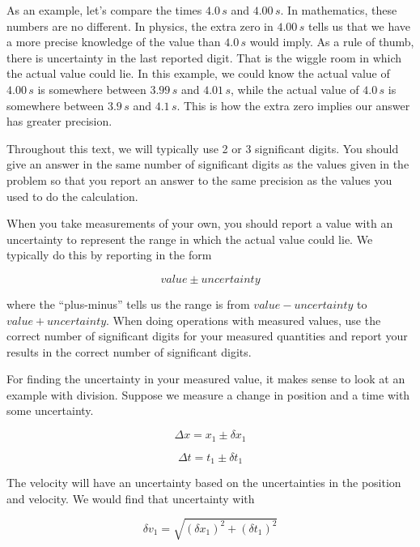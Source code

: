 \documentclass[12pt]{book}
\begin{document}
As an example, let's compare the times $4.0 \, s$ and $4.00 \, s$. In mathematics, these numbers are no different. In physics, the extra zero in $4.00 \, s$ tells us that we have a more precise knowledge of the value than $4.0 \, s$ would imply. As a rule of thumb, there is uncertainty in the last reported digit. That is the wiggle room in which the actual value could lie. In this example, we could know the actual value of $4.00 \, s$ is somewhere between $3.99 \, s$ and $4.01 \, s$, while the actual value of $4.0 \, s$ is somewhere between $3.9 \, s$ and $4.1 \, s$. This is how the extra zero implies our answer has greater precision.

Throughout this text, we will typically use 2 or 3 significant digits. You should give an answer in the same number of significant digits as the values given in the problem so that you report an answer to the same precision as the values you used to do the calculation.

When you take measurements of your own, you should report a value with an uncertainty to represent the range in which the actual value could lie. We typically do this by reporting in the form 

\begin{equation}
value \pm uncertainty
\end{equation}

where the ``plus-minus'' tells us the range is from $value - uncertainty$ to $value + uncertainty$. When doing operations with measured values, use the correct number of significant digits for your measured quantities and report your results in the correct number of significant digits.

For finding the uncertainty in your measured value, it makes sense to look at an example with division. Suppose we measure a change in position and a time with some uncertainty.

\begin{equation}
\Delta x = x_1 \pm \delta x_1
\end{equation}

\begin{equation}
\Delta t = t_1 \pm \delta t_1
\end{equation}

The velocity will have an uncertainty based on the uncertainties in the position and velocity. We would find that uncertainty with

\begin{equation}
\delta v_1 = \sqrt{(\delta x_1)^2 + (\delta t_1)^2}
\end{equation}
\end{document}
